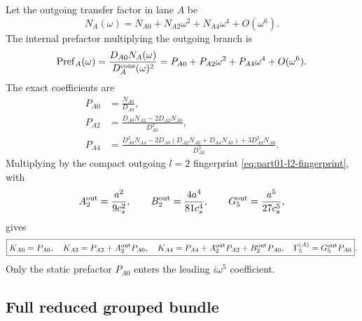 Let the outgoing transfer factor in lane \(A\) be
\begin{equation}
N_A(\omega)=N_{A0}+N_{A2}\omega^2+N_{A4}\omega^4+O(\omega^6).
\end{equation}
The internal prefactor multiplying the outgoing branch is
\begin{equation}
\label{eq:part01-PrefA-def}
\operatorname{Pref}_A(\omega)
=
\frac{D_{A0}N_A(\omega)}{D_A^{\rm cons}(\omega)^2}
=
P_{A0}+P_{A2}\omega^2+P_{A4}\omega^4+O(\omega^6).
\end{equation}
The exact coefficients are
\begin{equation}
\label{eq:part01-prefactor-coeffs}
\boxed{
\begin{aligned}
P_{A0}&=\frac{N_{A0}}{D_{A0}},\\
P_{A2}&=\frac{D_{A0}N_{A2}-2D_{A2}N_{A0}}{D_{A0}^2},\\
P_{A4}&=
\frac{D_{A0}^2N_{A4}-2D_{A0}(D_{A2}N_{A2}+D_{A4}N_{A0})+3D_{A2}^2N_{A0}}
{D_{A0}^3}.
\end{aligned}
}
\end{equation}
Multiplying by the compact outgoing \(l=2\) fingerprint \eqref{eq:part01-l2-fingerprint}, with
\begin{equation}
A_2^{\rm out}=\frac{a^2}{9c_s^2},
\qquad
B_2^{\rm out}=\frac{4a^4}{81c_s^4},
\qquad
G_5^{\rm out}=\frac{a^5}{27c_s^5},
\end{equation}
gives
\begin{equation}
\label{eq:part01-branch-K-Gamma}
\boxed{
K_{A0}=P_{A0},
\quad
K_{A2}=P_{A2}+A_2^{\rm out}P_{A0},
\quad
K_{A4}=P_{A4}+A_2^{\rm out}P_{A2}+B_2^{\rm out}P_{A0},
\quad
\Gamma_5^{(A)}=G_5^{\rm out}P_{A0}}.
\end{equation}
Only the static prefactor \(P_{A0}\) enters the leading \(i\omega^5\) coefficient.

\subsection{Full reduced grouped bundle}
\label{subsec:part01-full-bundle}

